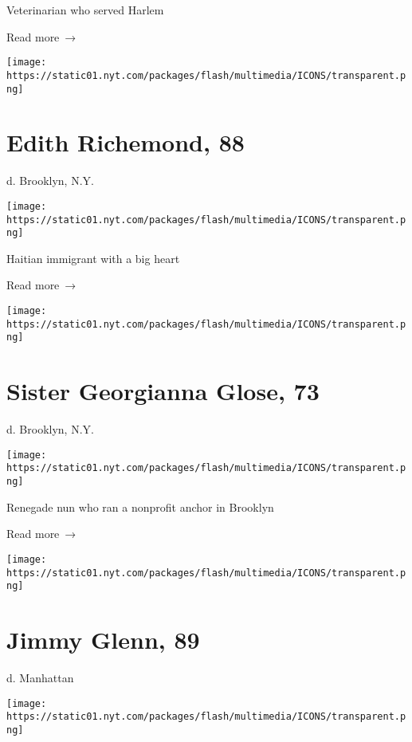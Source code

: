 Veterinarian who served Harlem

 Read more~→

\href{https://www.nytimes.com/2020/05/12/obituaries/edith-richmond-dead-coronavirus.html}{}

\texttt{[image: https://static01.nyt.com/packages/flash/multimedia/ICONS/transparent.png]}

\hypertarget{edith-richemond-88}{%
\section{Edith Richemond, 88}\label{edith-richemond-88}}

d. Brooklyn, N.Y.

\texttt{[image: https://static01.nyt.com/packages/flash/multimedia/ICONS/transparent.png]}

Haitian immigrant with a big heart

 Read more~→

\href{https://www.nytimes.com/2020/05/12/obituaries/sister-georgianna-glose-dead-coronavirus.html}{}

\texttt{[image: https://static01.nyt.com/packages/flash/multimedia/ICONS/transparent.png]}

\hypertarget{sister-georgianna-glose-73}{%
\section{Sister Georgianna Glose, 73}\label{sister-georgianna-glose-73}}

d. Brooklyn, N.Y.

\texttt{[image: https://static01.nyt.com/packages/flash/multimedia/ICONS/transparent.png]}

Renegade nun who ran a nonprofit anchor in Brooklyn

 Read more~→

\href{https://www.nytimes.com/2020/05/09/nyregion/jimmy-glenn-dead-coronavirus.html}{}

\texttt{[image: https://static01.nyt.com/packages/flash/multimedia/ICONS/transparent.png]}

\hypertarget{jimmy-glenn-89}{%
\section{Jimmy Glenn, 89}\label{jimmy-glenn-89}}

d. Manhattan

\texttt{[image: https://static01.nyt.com/packages/flash/multimedia/ICONS/transparent.png]}

